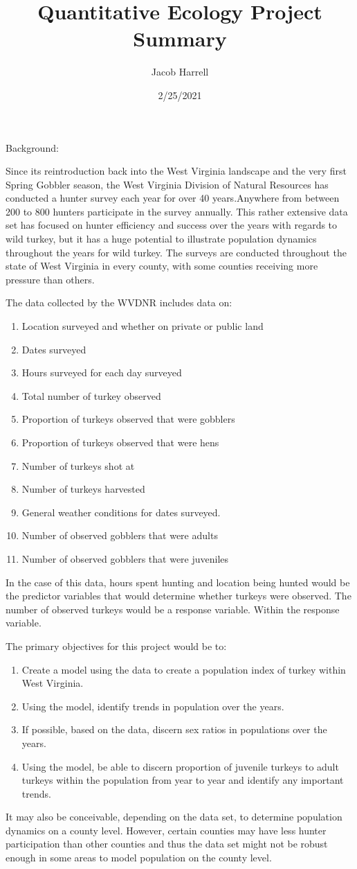 \documentclass[
]{article}
\title{Quantitative Ecology Project Summary}
\author{Jacob Harrell}
\date{2/25/2021}
\providecommand{\tightlist}{%
  \setlength{\itemsep}{0pt}\setlength{\parskip}{0pt}}
\begin{document}
\maketitle

Background:

Since its reintroduction back into the West Virginia landscape and the
very first Spring Gobbler season, the West Virginia Division of Natural
Resources has conducted a hunter survey each year for over 40
years.Anywhere from between 200 to 800 hunters participate in the survey
annually. This rather extensive data set has focused on hunter
efficiency and success over the years with regards to wild turkey, but
it has a huge potential to illustrate population dynamics throughout the
years for wild turkey. The surveys are conducted throughout the state of
West Virginia in every county, with some counties receiving more
pressure than others.

The data collected by the WVDNR includes data on:

\begin{enumerate}
\def\labelenumi{\arabic{enumi}.}
\tightlist
\item
  Location surveyed and whether on private or public land
\item
  Dates surveyed
\item
  Hours surveyed for each day surveyed
\item
  Total number of turkey observed
\item
  Proportion of turkeys observed that were gobblers
\item
  Proportion of turkeys observed that were hens
\item
  Number of turkeys shot at
\item
  Number of turkeys harvested
\item
  General weather conditions for dates surveyed.
\item
  Number of observed gobblers that were adults
\item
  Number of observed gobblers that were juveniles
\end{enumerate}

In the case of this data, hours spent hunting and location being hunted
would be the predictor variables that would determine whether turkeys
were observed. The number of observed turkeys would be a response
variable. Within the response variable.

The primary objectives for this project would be to:

\begin{enumerate}
\def\labelenumi{\arabic{enumi}.}
\tightlist
\item
  Create a model using the data to create a population index of turkey
  within West Virginia.
\item
  Using the model, identify trends in population over the years.
\item
  If possible, based on the data, discern sex ratios in populations over
  the years.
\item
  Using the model, be able to discern proportion of juvenile turkeys to
  adult turkeys within the population from year to year and identify any
  important trends.
\end{enumerate}

It may also be conceivable, depending on the data set, to determine
population dynamics on a county level. However, certain counties may
have less hunter participation than other counties and thus the data set
might not be robust enough in some areas to model population on the
county level.
\end{document}
